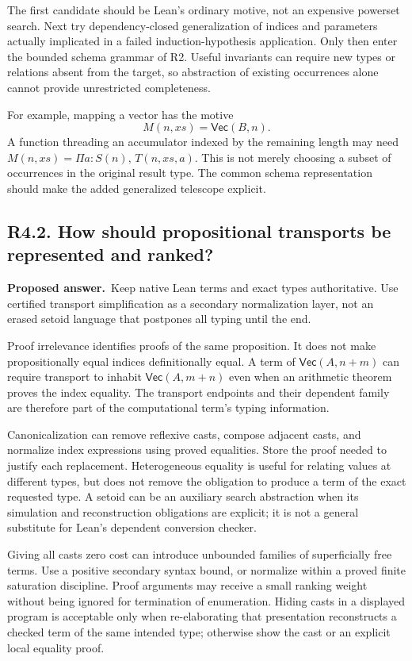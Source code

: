 \documentclass[11pt,a4paper]{article}
\newcommand{\question}[2]{\subsection{#1. #2}\label{q:#1}}
\newcommand{\answer}{\textbf{Proposed answer.}\ }
\theoremstyle{remark}
\begin{document}
The first candidate should be Lean's ordinary motive, not an expensive
powerset search. Next try dependency-closed generalization of indices and
parameters actually implicated in a failed induction-hypothesis application.
Only then enter the bounded schema grammar of R2. Useful invariants can
require new types or relations absent from the target, so abstraction of
existing occurrences alone cannot provide unrestricted completeness.

For example, mapping a vector has the motive
\[
 M(n,xs)=\mathsf{Vec}(B,n).
\]
A function threading an accumulator indexed by the remaining length may need
$M(n,xs)=\Pi a:S(n),\,T(n,xs,a)$. This is not merely choosing a subset of
occurrences in the original result type. The common schema representation
should make the added generalized telescope explicit.

\question{R4.2}{How should propositional transports be represented and ranked?}

\answer Keep native Lean terms and exact types authoritative. Use certified
transport simplification as a secondary normalization layer, not an erased
setoid language that postpones all typing until the end.

Proof irrelevance identifies proofs of the same proposition. It does not
make propositionally equal indices definitionally equal. A term of
$\mathsf{Vec}(A,n+m)$ can require transport to inhabit
$\mathsf{Vec}(A,m+n)$ even when an arithmetic theorem proves the index
equality. The transport endpoints and their dependent family are therefore
part of the computational term's typing information.

Canonicalization can remove reflexive casts, compose adjacent casts, and
normalize index expressions using proved equalities. Store the proof needed
to justify each replacement. Heterogeneous equality is useful for relating
values at different types, but does not remove the obligation to produce a
term of the exact requested type. A setoid can be an auxiliary search
abstraction when its simulation and reconstruction obligations are explicit;
it is not a general substitute for Lean's dependent conversion checker.

Giving all casts zero cost can introduce unbounded families of superficially
free terms. Use a positive secondary syntax bound, or normalize within a
proved finite saturation discipline. Proof arguments may receive a small
ranking weight without being ignored for termination of enumeration. Hiding
casts in a displayed program is acceptable only when re-elaborating that
presentation reconstructs a checked term of the same intended type; otherwise
show the cast or an explicit local equality proof.
\end{document}
